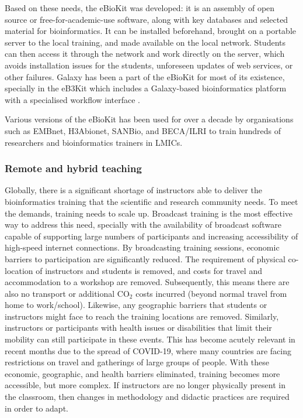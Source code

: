 \documentclass[10pt,letterpaper]{article}
\begin{document}
Based on these needs, the eBioKit \cite{Hernandez2017} was developed: it is an assembly of open source or free-for-academic-use software, along with key databases and selected material for bioinformatics. It can be installed beforehand, brought on a portable server to the local training, and made available on the local network. Students can then access it through the network and work directly on the server, which avoids installation issues for the students, unforeseen updates of web services, or other failures. Galaxy has been a part of the eBioKit for most of its existence, specially in the eB3Kit which includes a Galaxy-based bioinformatics platform with a specialised workflow interface \cite{Klingstrom_2017}. %

Various versions of the eBioKit has been used for over a decade by organisations such as EMBnet, H3Abionet, SANBio, and BECA/ILRI to train hundreds of researchers and bioinformatics trainers in LMICs.


\subsubsection*{Remote and hybrid teaching}

Globally, there is a significant shortage of instructors able to deliver the bioinformatics training that the scientific and research community needs. To meet the demands, training needs to scale up. Broadcast training is the most effective way to address this need, specially with the availability of broadcast software capable of supporting large numbers of participants and increasing accessibility of high-speed internet connections. By broadcasting training sessions, economic barriers to participation are significantly reduced. The requirement of physical co-location of instructors and students is removed, and costs for travel and accommodation to a workshop are removed. Subsequently, this means there are also no transport or additional CO$_2$ costs incurred (beyond normal travel from home to work/school). Likewise, any geographic barriers that students or instructors might face to reach the training locations are removed. Similarly, instructors or participants with health issues or disabilities that limit their mobility can still participate in these events. This has become acutely relevant in recent months due to the spread of COVID-19, where many countries are facing restrictions on travel and gatherings of large groups of people. With these economic, geographic, and health barriers eliminated, training becomes more accessible, but more complex. If instructors are no longer physically present in the classroom, then changes in methodology and didactic practices are required in order to adapt.
\end{document}
